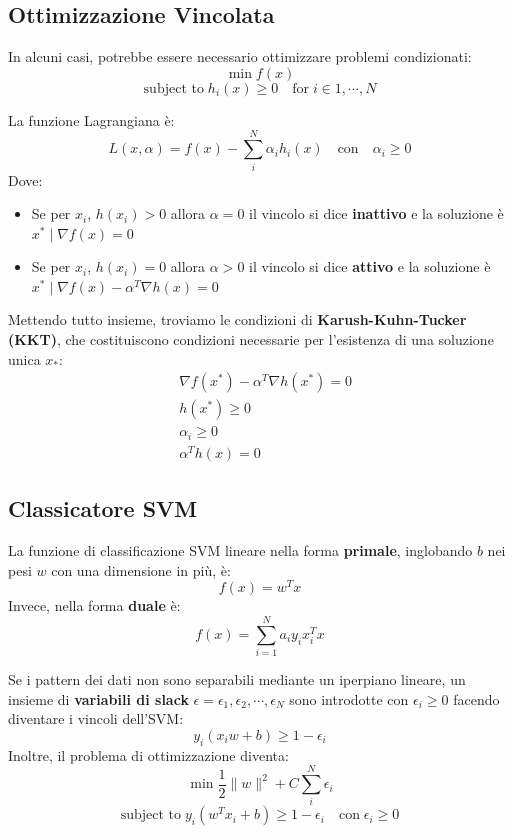 \subsection{Ottimizzazione Vincolata}
In alcuni casi, potrebbe essere necessario ottimizzare problemi condizionati:
\[
  \min f(x)
\]
\[
  \text{subject to} \; h_i(x) \ge 0 \quad \text{for} \; i \in 1, \cdots, N
\]
\begin{defn}
  La funzione Lagrangiana è:
  \[
    L(x, \alpha) = f(x) - \sum_{i}^N \alpha_i h_i(x) \quad \text{con} \quad \alpha_i \geq 0
  \]
  Dove:
  \begin{itemize}
    \item Se per $x_i$, $h(x_i) > 0$ allora $\alpha = 0$ il vincolo si dice \textbf{inattivo} e la soluzione è $x^* \mid \nabla f(x) = 0$
    \item Se per $x_i$, $h(x_i) = 0$ allora $\alpha > 0$ il vincolo si dice \textbf{attivo} e la soluzione è $x^* \mid \nabla f(x) - \alpha^T \nabla h(x) = 0$
  \end{itemize}
\end{defn}
Mettendo tutto insieme, troviamo le condizioni di \textbf{Karush-Kuhn-Tucker (KKT)}, che costituiscono condizioni necessarie per l'esistenza di una soluzione unica $x_*$:
\[
  \begin{aligned}
    &\nabla f(x^*) - \alpha^T \nabla h(x^*) = 0 \\
    &h(x^*) \ge 0 \\
    &\alpha_i \geq 0 \\
    &\alpha^T h(x) = 0
  \end{aligned}
\]
\subsection{Classicatore SVM}
La funzione di classificazione SVM lineare nella forma \textbf{primale}, inglobando $b$ nei pesi $w$ con una dimensione in più, è:
\[
  f(x) = w^T x
\]
Invece, nella forma \textbf{duale} è:
\[
  f(x) = \sum^N_{i=1}{a_i y_i x_i^T x}
\]
\begin{note}
  Se i pattern dei dati non sono separabili mediante un iperpiano lineare, un insieme di \textbf{variabili di slack} $\epsilon = \epsilon_1, \epsilon_2, \cdots, \epsilon_N$ sono introdotte con $\epsilon_i \ge 0$ 
  facendo diventare i vincoli dell'SVM: 
  \[
    y_i(x_i w + b) \ge 1 - \epsilon_i
  \]
  Inoltre, il problema di ottimizzazione diventa:
  \[
    \min \frac{1}{2} \| w \|^2 + C \sum_i^N{\epsilon_i}
  \]
  \[
    \text{subject to} \; y_i(w^T x_i + b) \ge 1 - \epsilon_i \quad \text{con} \; \epsilon_i \ge 0
  \]
\end{note}

